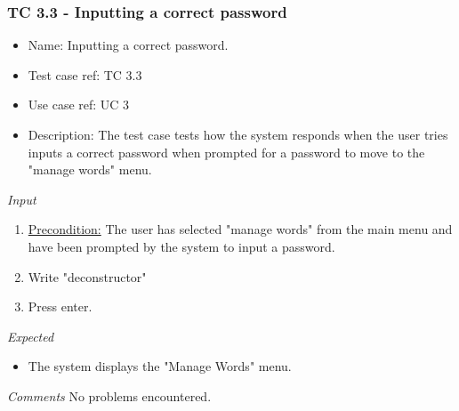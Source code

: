 \documentclass[12pt, letterpaper]{article}
\begin{document}
\subsubsection{TC 3.3 - Inputting a correct password}
\begin{itemize}
	\item Name: Inputting a correct password.
	\item Test case ref: TC 3.3
	\item Use case ref: UC 3
	\item Description: The test case tests how the system responds when the user tries inputs a correct password when prompted for a password to move to the "manage words" menu.
\end{itemize}
\emph{Input}
\begin{enumerate}
	\item \underline{Precondition:} The user has selected "manage words" from the main menu and have been prompted by the system to input a password.
	\item Write "deconstructor"
	\item Press enter.
\end{enumerate}
\emph{Expected}
\begin{itemize}
	\item The system displays the "Manage Words" menu.
\end{itemize}
\begin{Form}
	\newline
	\newline
\end{Form}
\newline
\emph{Comments}
No problems encountered.
\end{document}
